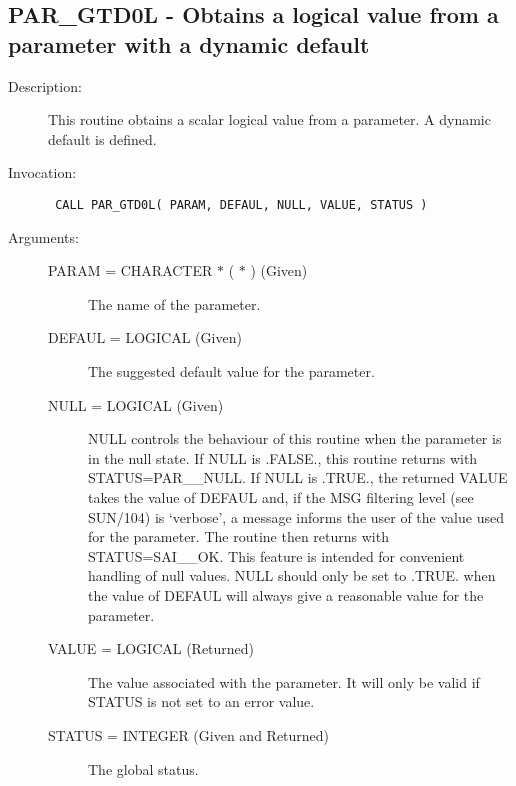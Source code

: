 \documentclass[twoside,11pt]{article}
\newcommand{\xref}[3]{#1}
\newcommand{\xlabel}[1]{}
\newcommand{\latex}[1]{#1}
\newlength{\sstbannerlength}
\newlength{\sstcaptionlength}
\newlength{\sstexampleslength}
\newlength{\sstexampleswidth}
\newcommand{\sstroutine}[3]{
   \goodbreak
   \rule{\textwidth}{0.5mm}
   \vspace{-7ex}
   \newline
   \settowidth{\sstbannerlength}{{\Large {\bf #1}}}
   \setlength{\sstcaptionlength}{\textwidth}
   \setlength{\sstexampleslength}{\textwidth}
   \addtolength{\sstbannerlength}{0.5em}
   \addtolength{\sstcaptionlength}{-2.0\sstbannerlength}
   \addtolength{\sstcaptionlength}{-5.0pt}
   \settowidth{\sstexampleswidth}{{\bf Examples:}}
   \addtolength{\sstexampleslength}{-\sstexampleswidth}
   \parbox[t]{\sstbannerlength}{\flushleft{\Large {\bf #1}}}
   \parbox[t]{\sstcaptionlength}{\center{\Large #2}}
   \parbox[t]{\sstbannerlength}{\flushright{\Large {\bf #1}}}
   \begin{description}
      #3
   \end{description}
}
\newcommand{\sstdescription}[1]{\item[Description:] #1}
\newcommand{\sstinvocation}[1]{\item[Invocation:]\hspace{0.4em}{\tt #1}}
\newcommand{\sstarguments}[1]{
   \item[Arguments:] \mbox{} \\
   \vspace{-3.5ex}
   \begin{description}
      #1
   \end{description}
}
\newcommand{\sstsubsection}[1]{ \item[{#1}] \mbox{} \\}
\newcommand{\ssttt}{\tt}
\renewcommand{\sstroutine}[3]{
      \subsection{\xlabel{12}#1\xlabel{#1}-\label{#1}#2}
      \begin{description}
         #3
      \end{description}
   }
\renewcommand{\sstdescription}[1]{\item[Description:]
      \begin{description}
         #1
      \end{description}
   }
\renewcommand{\sstinvocation}[1]{\item[Invocation:]
      \begin{description}
         {\ssttt #1}
      \end{description}
   }
\renewcommand{\sstarguments}[1]{
      \item[Arguments:]
      \begin{description}
         #1
      \end{description}
   }
\renewcommand{\sstsubsection}[1]{\item[{#1}]}
\begin{document}
\sstroutine{
   PAR\_GTD0L
}{
   Obtains a logical value from a parameter with a dynamic
   default
}{
   \sstdescription{
      This routine obtains a scalar logical value from a parameter.
      A dynamic default is defined.
   }
   \sstinvocation{
      CALL PAR\_GTD0L( PARAM, DEFAUL, NULL, VALUE, STATUS )
   }
   \sstarguments{
      \sstsubsection{
         PARAM = CHARACTER $*$ ( $*$ ) (Given)
      }{
         The name of the parameter.
      }
      \sstsubsection{
         DEFAUL = LOGICAL (Given)
      }{
         The suggested default value for the parameter.
      }
      \sstsubsection{
         NULL = LOGICAL (Given)
      }{
         NULL controls the behaviour of this routine when the parameter
         is in the null state.  If NULL is .FALSE., this routine
         returns with STATUS=PAR\_\_NULL.  If NULL is .TRUE., the
         returned VALUE takes the value of DEFAUL and, if the
\xref{MSG filtering level}{sun104}{conditional_message_reporting}
\latex{ (see SUN/104)} is `verbose',
         a message informs the user of the value used for
         the parameter. The routine then returns with STATUS=SAI\_\_OK. 
         This feature is intended for convenient handling of null values.
         NULL should only be set to .TRUE. when the value of DEFAUL will
         always give a reasonable value for the parameter.
      }
      \sstsubsection{
         VALUE  = LOGICAL (Returned)
      }{
         The value associated with the parameter.  It will only be
         valid if STATUS is not set to an error value.
      }
      \sstsubsection{
         STATUS = INTEGER (Given and Returned)
      }{
         The global status.
      }
   }
}
\end{document}
